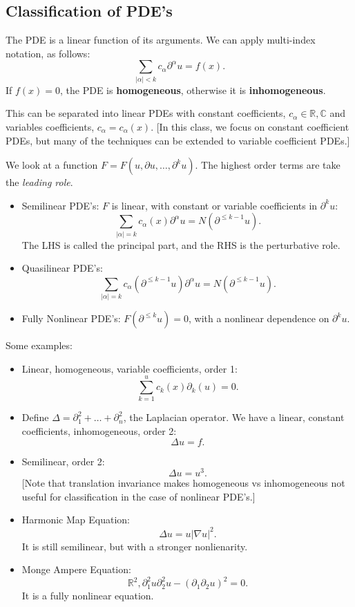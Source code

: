 \documentclass[12pt]{scrartcl}
\newcommand{\R}{\mathbb{R}}
\newcommand{\C}{\mathbb C}
\begin{document}
\subsection{Classification of PDE's}
\begin{definition} The PDE is a linear function of its arguments.  We can apply multi-index notation, as follows:
$$\sum_{|\alpha| < k} c_\alpha \partial^{\alpha}u = f(x).$$
If $f(x) = 0$, the PDE is \textbf{homogeneous}, otherwise it is \textbf{inhomogeneous}.
\end{definition}
This can be separated into linear PDEs with constant coefficients, $c_{\alpha } \in \R, \C$ and variables coefficients, $c_{\alpha} = c_{\alpha}(x)$.  [In this class, we focus on constant coefficient PDEs, but many of the techniques can be extended to variable coefficient PDEs.]
\begin{definition}We look at a function $F = F(u, \partial u, \dots, \partial^k u)$.  The highest order terms are take the \textit{leading role}. 
\begin{itemize}
\item Semilinear PDE's: $F$ is linear, with constant or variable coefficients in $\partial^k u$: $$\sum_{|\alpha| = k} c_{\alpha}(x)\partial^\alpha u = N(\partial^{\le k-1}u).$$
The LHS is called the principal part, and the RHS is the perturbative role.
\item Quasilinear PDE's: 
$$\sum_{|\alpha|=k} c_{\alpha}(\partial^{\le k-1} u) \partial^{\alpha}u = N(\partial^{\le k-1}u).$$
\item Fully Nonlinear PDE's: $F(\partial^{\le k} u) = 0$, with a nonlinear dependence on $\partial^k u$.  
\end{itemize}
\end{definition}
Some examples:
\begin{itemize}
\item Linear, homogeneous, variable coefficients, order 1:$$\sum_{k=1}^u c_k(x)\partial_k(u) = 0.$$
\item Define $\Delta = \partial_1^2 + \dots + \partial_n^2$, the Laplacian operator.  We have a linear, constant coefficients, inhomogeneous, order 2:$$\Delta u = f.$$
\item Semilinear, order 2: $$\Delta u = u^3.$$ [Note that translation invariance makes homogeneous vs inhomogeneous not useful for classification in the case of nonlinear PDE's.]
\item Harmonic Map Equation:
$$\Delta u = u |\nabla u|^2.$$
It is still semilinear, but with a stronger nonlienarity.
\item Monge Ampere Equation:
$$\R^2, \partial_1^2 u \partial_2^2 u - (\partial_1 \partial_2 u)^2 = 0.$$
It is a fully nonlinear equation.
\end{itemize}
\end{document}
